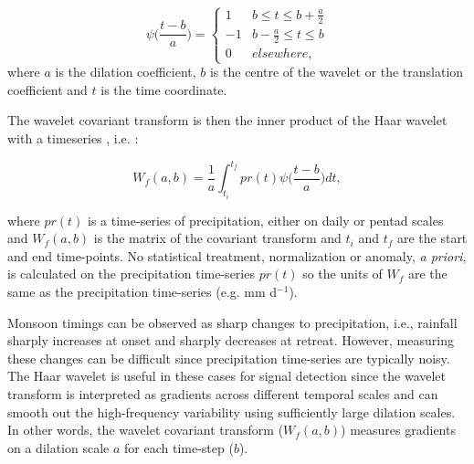 \begin{equation}
\psi \bigg(\frac{t-b}{a}\bigg)=
\begin{cases}
      1 & b\leq t \leq b+\frac{a}{2} \\
      -1 & b-\frac{a}{2} \leq t \leq b \\
      0 & elsewhere,
   \end{cases}
   \label{eq:haar}
\end{equation}
%
\noindent where $a$ is the dilation coefficient, $b$ is the centre of the wavelet or the translation coefficient and $t$ is the time coordinate.

The wavelet covariant transform is then the inner product of the Haar wavelet with a timeseries \citep{brooks2003}, i.e. :

\begin{equation}
W_f(a,b)=\frac{1}{a}\int_{t_i}^{t_f}pr(t)\psi \bigg(\frac{t-b}{a}\bigg) dt,
   \label{eq:wf}
\end{equation}

where $pr(t)$ is a time-series of precipitation, either on daily or pentad scales and $W_f(a,b)$ is the matrix of the covariant transform and $t_i$ and $t_f$ are the start and end time-points. No statistical treatment, normalization or anomaly, \textit{a priori}, is calculated on the precipitation time-series $pr(t)$ so the units of $W_f$ are the same as the precipitation time-series (e.g. mm d$^{-1}$).

 Monsoon timings can be observed as sharp changes to precipitation, i.e., rainfall sharply increases at onset and sharply decreases at retreat. However, measuring these changes can be difficult since precipitation time-series are typically noisy. The Haar wavelet is useful in these cases for signal detection since the wavelet transform is interpreted as  gradients across different temporal scales and can smooth out the high-frequency variability using sufficiently large dilation scales. 
  In other words, the wavelet covariant transform ($W_f(a,b)$) measures gradients on a dilation scale $a$ for each time-step ($b$).
  
